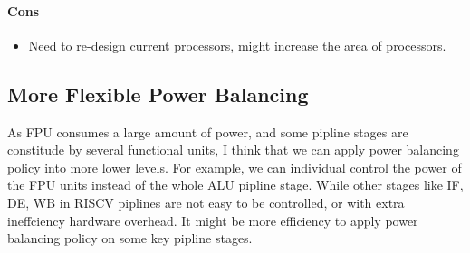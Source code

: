 \documentclass[10pt,a4paper]{article}
\begin{document}
\paragraph{Cons}
\begin{itemize}
    \item Need to re-design current processors, might increase the area of processors.
\end{itemize}
\subsection{More Flexible Power Balancing}
As FPU consumes a large amount of power, and some pipline stages are constitude by several functional units, I think that we can apply power balancing policy into more lower levels. For example, we can individual control the power of the FPU units instead of the whole ALU pipline stage. While other stages like IF, DE, WB in RISCV piplines are not easy to be controlled, or with extra ineffciency hardware overhead. It might be more efficiency to apply power balancing policy on some key pipline stages.  
\end{document}
